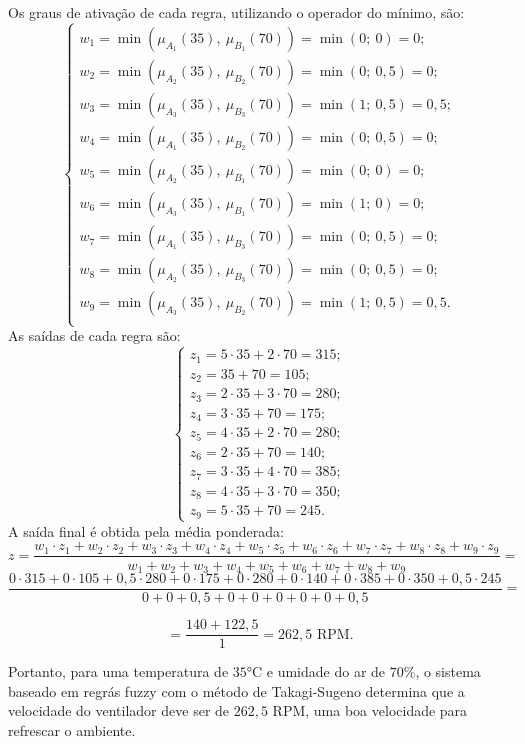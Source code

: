 Os graus de ativação de cada regra, utilizando o operador do mínimo, são:
$$
\begin{cases}
    w_1 = \min(\mu_{A_1}(35),\ \mu_{B_1}(70)) = \min(0;\ 0) = 0;\\
    w_2 = \min(\mu_{A_2}(35),\ \mu_{B_2}(70)) = \min(0;\ 0{,}5) = 0;\\
    w_3 = \min(\mu_{A_3}(35),\ \mu_{B_3}(70)) = \min(1;\ 0{,}5) = 0{,}5;\\
    w_4 = \min(\mu_{A_1}(35),\ \mu_{B_2}(70)) = \min(0;\ 0{,}5) = 0;\\
    w_5 = \min(\mu_{A_2}(35),\ \mu_{B_1}(70)) = \min(0;\ 0) = 0;\\
    w_6 = \min(\mu_{A_3}(35),\ \mu_{B_1}(70)) = \min(1;\ 0) = 0;\\
    w_7 = \min(\mu_{A_1}(35),\ \mu_{B_3}(70)) = \min(0;\ 0{,}5) = 0;\\
    w_8 = \min(\mu_{A_2}(35),\ \mu_{B_3}(70)) = \min(0;\ 0{,}5) = 0;\\
    w_9 = \min(\mu_{A_3}(35),\ \mu_{B_2}(70)) = \min(1;\ 0{,}5) = 0{,}5.\\
\end{cases}
$$
As saídas de cada regra são:
$$
\begin{cases}
z_1 = 5 \cdot 35 + 2 \cdot 70 = 315; \\
z_2 = 35 + 70 = 105; \\
z_3 = 2 \cdot 35 + 3 \cdot 70 = 280; \\
z_4 = 3 \cdot 35 + 70 = 175; \\
z_5 = 4 \cdot 35 + 2 \cdot 70 = 280; \\
z_6 = 2 \cdot 35 + 70 = 140; \\
z_7 = 3 \cdot 35 + 4 \cdot 70 = 385; \\
z_8 = 4 \cdot 35 + 3 \cdot 70 = 350; \\
z_9 = 5 \cdot 35 + 70 = 245.
\end{cases}
$$
A saída final é obtida pela média ponderada:
$$z = \frac{w_1 \cdot z_1 + w_2 \cdot z_2 + w_3 \cdot z_3 + w_4 \cdot z_4 + w_5 \cdot z_5 + w_6 \cdot z_6 + w_7 \cdot z_7 + w_8 \cdot z_8 + w_9 \cdot z_9}{w_1 + w_2 + w_3 + w_4 + w_5 + w_6 + w_7 + w_8 + w_9} = 
$$
$$
\frac{0 \cdot 315 + 0 \cdot 105 +  0{,}5 \cdot 280 + 0 \cdot 175 + 0 \cdot 280 + 0 \cdot 140 + 0 \cdot 385 + 0 \cdot 350 + 0{,}5 \cdot 245}{0 + 0 + 0{,}5 + 0 + 0 + 0 + 0 + 0 + 0{,}5} =
$$ 

$$= \frac{140 + 122{,}5}{1} =  262{,}5 \text{ RPM}.
$$

Portanto, para uma temperatura de $35$°C e umidade do ar de $70$\%, o sistema baseado em regrás fuzzy com o método de Takagi-Sugeno determina que a velocidade do ventilador deve ser de $262{,}5$ RPM, uma boa velocidade para refrescar o ambiente.


